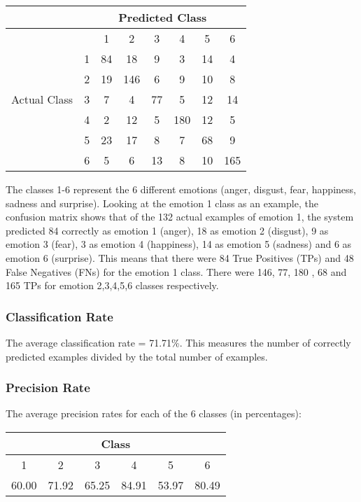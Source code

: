 \documentclass[a4paper,11pt]{article}
\begin{document}
\begin{center}
 \begin{tabular}{| c |p{0.5cm} | c | c | c | c | c | c|} 
 \hline
   & \multicolumn{7}{|c|}{Predicted Class} \\
  \hline
 \multirow{7}{*}{Actual Class} &  & 1 & 2 & 3 & 4 & 5 & 6 \\  [1ex]
 \cline{2-8}
 & 1 & 84 & 18 & 9 & 3 & 14 & 4 \\ 
 \cline{2-8}
 & 2 & 19 & 146 & 6 & 9 & 10 & 8 \\
 \cline{2-8}
 & 3 & 7 & 4 & 77 & 5 & 12 & 14 \\
 \cline{2-8}
 & 4 & 2 & 12 & 5 & 180 & 12 & 5 \\
 \cline{2-8}
 & 5 & 23 & 17 & 8 & 7 & 68 & 9 \\ 
 \cline{2-8}
 & 6 & 5 & 6 & 13 & 8 & 10 & 165 \\ 
 \hline

\end{tabular}
\end{center}


The classes 1-6 represent the 6 different emotions (anger, disgust, fear, happiness, sadness and surprise). Looking at the emotion 1 class as an example, the confusion matrix shows that of the 132 actual examples of emotion 1, the system predicted 84 correctly as emotion 1 (anger), 18 as emotion 2 (disgust), 9 as emotion 3 (fear), 3 as emotion 4 (happiness), 14 as emotion 5 (sadness) and 6 as emotion 6 (surprise). This means that there were 84 True Positives (TPs) and 48 False Negatives (FNs) for the emotion 1 class. There were 146, 77, 180 , 68 and 165 TPs for emotion 2,3,4,5,6 classes respectively. 

\subsubsection{Classification Rate}

The average classification rate = 71.71\%. This measures the number of correctly predicted examples divided by the total number of examples.   

\subsubsection{Precision Rate}

The average precision rates for each of the 6 classes (in percentages):

\begin{center}
 \begin{tabular}{| c | c | c | c | c | c |} 
 \hline
 \multicolumn{6}{|c|}{Class} \\
 \hline
  1 & 2 & 3 & 4 & 5 & 6 \\  [1ex]
 \hline
 60.00 & 71.92 & 65.25 & 84.91 & 53.97 & 80.49 \\ 
 \hline
 \end{tabular}
\end{center}
\end{document}
